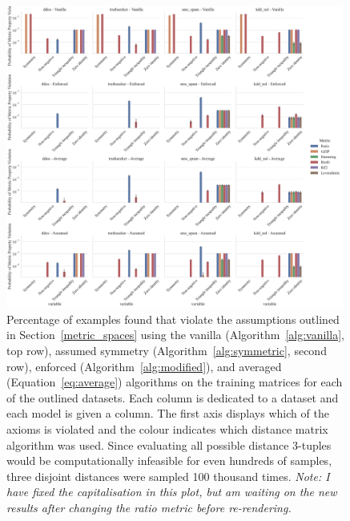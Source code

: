 \documentclass[preprint,12pt]{article}
\newcommand{\cm}[1]{\textit{{\color{blue}#1}}}
\begin{document}
\begin{figure}[h!]
    \centering
    \includegraphics[width=0.99\textwidth]{images/read_world_check.pdf}
    \caption{Percentage of examples found that violate the assumptions outlined in Section~\ref{metric_spaces} using the vanilla (Algorithm~\ref{alg:vanilla}, top row), assumed symmetry (Algorithm~\ref{alg:symmetric}, second row), enforced (Algorithm~\ref{alg:modified}), and averaged (Equation~\ref{eq:average}) algorithms on the training matrices for each of the outlined datasets. Each column is dedicated to a dataset and each model is given a column. The first axis displays which of the axioms is violated and the colour indicates which distance matrix algorithm was used. Since evaluating all possible distance 3-tuples would be computationally infeasible for even hundreds of samples, three disjoint distances were sampled  100 thousand times. \cm{Note: I have fixed the capitalisation in this plot, but am waiting on the new results after changing the ratio metric before re-rendering.}}
    \label{fig:real_world_check}
\end{figure}
\end{document}
